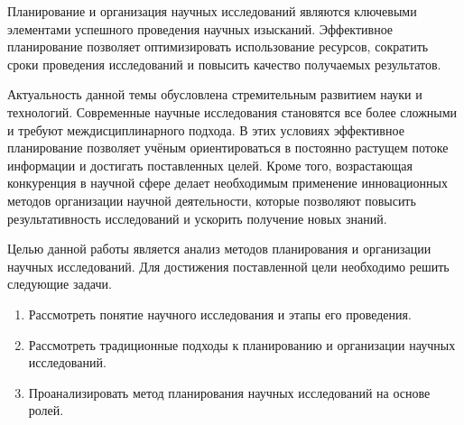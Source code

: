 
Планирование и организация научных исследований являются ключевыми элементами успешного проведения научных изысканий. Эффективное планирование позволяет оптимизировать использование ресурсов, сократить сроки проведения исследований и повысить качество получаемых результатов.

Актуальность данной темы обусловлена стремительным развитием науки и технологий. Современные научные исследования становятся все более сложными и требуют междисциплинарного подхода. В этих условиях эффективное планирование позволяет учёным ориентироваться в постоянно растущем потоке информации и достигать поставленных целей. Кроме того, возрастающая конкуренция в научной сфере делает необходимым применение инновационных методов организации научной деятельности, которые позволяют повысить результативность исследований и ускорить получение новых знаний.

Целью данной работы является анализ методов планирования и организации научных исследований. Для достижения поставленной цели необходимо решить следующие задачи.

\begin{enumerate}[label*=\arabic*.]
	\item Рассмотреть понятие научного исследования и этапы его проведения.
	\item Рассмотреть традиционные подходы к планированию и организации научных исследований.
	\item Проанализировать метод планирования научных исследований на основе ролей.
\end{enumerate}

\clearpage
